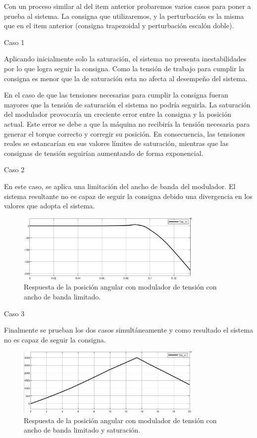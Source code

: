 \documentclass{article}
\begin{document}
Con un proceso similar al del item anterior probaremos varios casos para poner a prueba al sistema.
La consigna que utilizaremos, y la perturbación es la misma que en el item anterior (consigna trapezoidal y perturbación escalón doble).

\bullet Caso 1

Aplicando inicialmente solo la saturación, el sistema no presenta inestabilidades por lo que logra 
seguir la consigna. Como la tensión de trabajo para cumplir la consigna es menor que la de saturación 
esta no afecta al desempeño del sistema. 

En el caso de que las tensiones necesarias para cumplir la consigna fueran mayores que la tensión de saturación
el sistema no podría seguirla. La saturación del modulador provocaría un creciente error entre la consigna y la
posición actual. Este error se debe a que la máquina no recibiría la tensión necesaria para generar 
el torque correcto y corregir su posición. En consecuencia, las tensiones reales se estancarían en 
sus valores límites de saturación, mientras que las consignas de tensión seguirían aumentando de 
forma exponencial.

\bullet Caso 2

En este caso, se aplica una limitación del ancho de banda del modulador. El sistema resultante no es
capaz de seguir la consigna debido una divergencia en los valores que adopta el sistema.

\begin{figure}[H]
    \centering
    \includegraphics[width=0.8\textwidth]{5.2.5.e.2.png}
    \caption{Respuesta de la posición angular con modulador de tensión con ancho de banda limitado.}
\end{figure}

\bullet Caso 3

Finalmente se prueban los dos casos simultáneamente y como resultado el sistema no es capaz de seguir la consigna. 

\begin{figure}[H]
    \centering
    \includegraphics[width=0.8\textwidth]{5.2.5.e.3.png}
    \caption{Respuesta de la posición angular con modulador de tensión con ancho de banda limitado y saturación.}
\end{figure}
\end{document}
